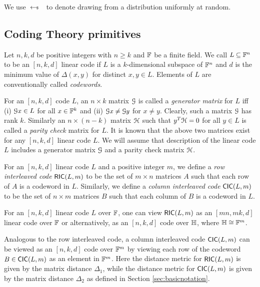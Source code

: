 We use $\sample$ to denote drawing from a distribution uniformly at random.
\subsection{Coding Theory primitives}\label{subsec:coding_theory}
\begin{definition}\label{defn:lincode}
	Let $n,k,d$ be positive integers with $n\geq k$ and $\FF$ be a finite field. We
	call $L\subseteq \FF^n$ to be an $[n,k,d]$ linear code if $L$ is a $k$-dimensional
	subspace of $\FF^n$ and $d$ is the minimum value of $\Delta(x,y)$ for distinct
	$x,y\in L$. Elements of $L$ are conventionally called {\em codewords}.
\end{definition}

For an $[n,k,d]$ code $L$, an $n\times k$ matrix $\calG$ is called a {\em
	generator matrix} for $L$ iff (i) $\calG x\in L$ for all $x \in \bbF^k$ and (ii)
$\calG x\neq \calG y$ for $x\neq y$. Clearly, such a matrix $\calG$ has rank
$k$. Similarly an $n\times (n-k)$ matrix $\calH$ such that $y^T \calH = 0$ for
all $y\in L$ is called a {\em parity check} matrix for $L$. It is known
that the above two matrices exist for any $[n,k,d]$ linear code $L$. We will
assume that description of the linear code $L$ includes a generator matrix
$\calG$ and a parity check matrix $\calH$.

\begin{definition}\label{defn:interleavedcode}
	For an $[n,k,d]$ linear code $L$ and a positive integer $m$, we define a {\em row interleaved code} $\ric{L}{m}$ to be the set of $m\times n$ matrices $A$ such that each row of $A$ is a codeword in $L$. Similarly, we define a {\em column interleaved code} $\cic{L}{m}$ to be the set of $n\times m$ matrices $B$ such that each column of $B$ is a codeword in $L$.
\end{definition}

For  an  $[n,k,d]$ linear code $L$ over $\FF$, one can view $\ric{L}{m}$ as
an $[mn,mk,d]$ linear code over  $\FF$ or alternatively,  as an $[n,k,d]$ code over $\HH$, where $\HH\cong \FF^m$. 

Analogous to the row interleaved code, a column interleaved code $\cic{L}{m}$ 
can be viewed as an $[n,k,d]$ code over $\bbF^m$ by viewing each row of the
codeword $B\in \cic{L}{m}$ as an element in $\bbF^m$. Here the distance metric
for $\ric{L}{m}$ is given by the matrix distance $\Delta_1$, while the distance
metric for $\cic{L}{m}$ is given by the matrix distance $\Delta_2$ as defined in
Section \ref{sec:basicnotation}.  

